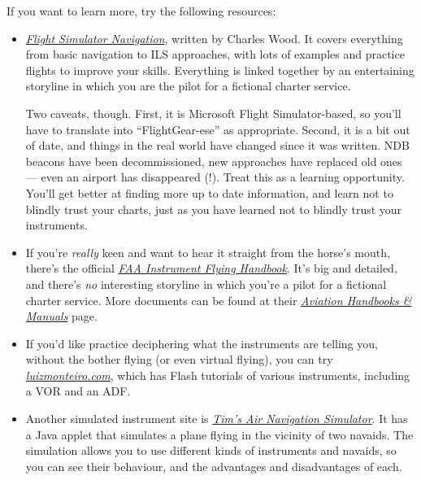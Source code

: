 If you want to learn more, try the following resources:

\begin{itemize}
\item \href{http://www.navfltsm.addr.com}{\textit{Flight Simulator
    Navigation}}, written by Charles Wood.  It covers everything from
  basic navigation to ILS approaches, with lots of examples and
  practice flights to improve your skills.  Everything is linked
  together by an entertaining storyline in which you are the pilot for
  a fictional charter service.

  Two caveats, though.  First, it is Microsoft Flight Simulator-based,
  so you'll have to translate into ``FlightGear-ese'' as appropriate.
  Second, it is a bit out of date, and things in the real world have
  changed since it was written.  NDB beacons have been decommissioned,
  new approaches have replaced old ones --- even an airport has
  disappeared (!).  Treat this as a learning opportunity.  You'll get
  better at finding more up to date information, and learn not to
  blindly trust your charts, just as you have learned not to blindly
  trust your instruments.

\item If you're \emph{really} keen and want to hear it straight from
  the horse's mouth, there's the official
  \href{http://www.faa.gov/regulations_policies/handbooks_manuals/aviation/media/FAA-H-8083-15B.pdf}{\textit{FAA
      Instrument Flying Handbook}}.  It's big and detailed, and
  there's \emph{no} interesting storyline in which you're a pilot for
  a fictional charter service.  More documents can be found at their
  \href{http://www.faa.gov/regulations_policies/handbooks_manuals/aviation/}{\textit{Aviation
      Handbooks \& Manuals}} page.


\item If you'd like practice deciphering what the instruments are
  telling you, without the bother flying (or even virtual flying), you
  can try
  \href{http://www.luizmonteiro.com/Learning.aspx}{\textit{luizmonteiro.com}},
  which has Flash tutorials of various instruments, including a VOR
  and an ADF.

\item Another simulated instrument site is
  \href{http://www.visi.com/~mim/nav/}{\textit{Tim's Air Navigation
      Simulator}}.  It has a Java applet that simulates a plane flying
  in the vicinity of two navaids.  The simulation allows you to use
  different kinds of instruments and navaids, so you can see their
  behaviour, and the advantages and disadvantages of each.


\end{itemize}
